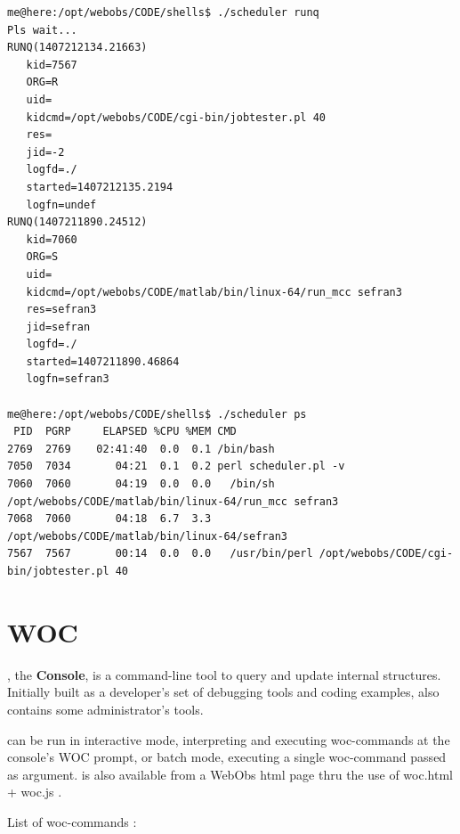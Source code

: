 \begin{lstlisting}[style=console,title=example runq and ps]
me@here:/opt/webobs/CODE/shells$ ./scheduler runq
Pls wait...
RUNQ(1407212134.21663)
   kid=7567
   ORG=R
   uid=
   kidcmd=/opt/webobs/CODE/cgi-bin/jobtester.pl 40 
   res=
   jid=-2
   logfd=./
   started=1407212135.2194
   logfn=undef
RUNQ(1407211890.24512)
   kid=7060
   ORG=S
   uid=
   kidcmd=/opt/webobs/CODE/matlab/bin/linux-64/run_mcc sefran3 
   res=sefran3
   jid=sefran
   logfd=./
   started=1407211890.46864
   logfn=sefran3

me@here:/opt/webobs/CODE/shells$ ./scheduler ps
 PID  PGRP     ELAPSED %CPU %MEM CMD
2769  2769    02:41:40  0.0  0.1 /bin/bash
7050  7034       04:21  0.1  0.2 perl scheduler.pl -v
7060  7060       04:19  0.0  0.0   /bin/sh /opt/webobs/CODE/matlab/bin/linux-64/run_mcc sefran3
7068  7060       04:18  6.7  3.3     /opt/webobs/CODE/matlab/bin/linux-64/sefran3
7567  7567       00:14  0.0  0.0   /usr/bin/perl /opt/webobs/CODE/cgi-bin/jobtester.pl 40
\end{lstlisting}

\section{WOC}

, the \webobs \textbf{Console}, is a command-line tool to query and update internal \webobs structures.
Initially built as a developer's set of debugging tools and coding examples,  also contains some \webobs administrator's tools. 

 can be run in interactive mode, interpreting and executing woc-commands at the console's WOC prompt, or 
batch mode, executing a single woc-command passed as argument.  is also available from a WebObs html page 
thru the use of woc.html + woc.js .

List of woc-commands :

